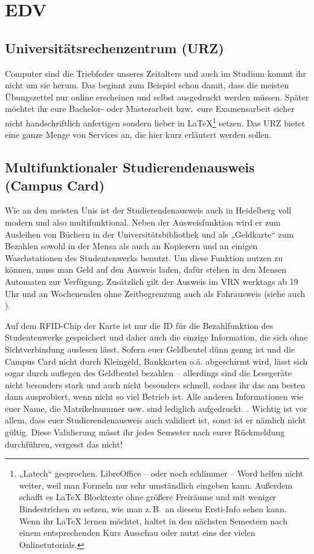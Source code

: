 \section{EDV}

\subsection{Universitätsrechenzentrum (URZ)}
\label{urz}
Computer sind die Triebfeder unseres Zeitalters und auch im Studium kommt ihr nicht um sie herum. Das beginnt zum Beispiel schon damit, dass die meisten Übungszettel nur online erscheinen und selbst ausgedruckt werden müssen. Später möchtet ihr eure Bachelor- oder Masterarbeit bzw.\ eure Examensarbeit sicher nicht handschriftlich anfertigen sondern lieber in \LaTeX \footnote{„Latech“ gesprochen. LibreOffice -- oder noch schlimmer -- Word helfen nicht weiter, weil man Formeln nur sehr umständlich eingeben kann. Außerdem schafft es \LaTeX{} Blocktexte ohne größere Freiräume und mit weniger Bindestrichen zu setzen, wie man z.\,B.\ an diesem Ersti-Info sehen kann. Wenn ihr \LaTeX{} lernen möchtet, haltet in den nächsten Semestern nach einem entsprechenden Kurs Ausschau oder nutzt eins der vielen Onlinetutorials.} setzen. Das  \gls{URZ} bietet eine ganze Menge von Services an, die hier kurz erläutert werden sollen.

\subsection*{Multifunktionaler Studierendenausweis (Campus Card)}
\label{campuscard}
Wie an den meisten Unis ist der Studierendenausweis auch in Heidelberg voll modern und also multifunktional.
Neben der Ausweisfunktion wird er zum Ausleihen von Büchern in der Universitätsbibliothek und als „Geldkarte“ zum Bezahlen sowohl in der Mensa als auch an Kopierern und an einigen Waschstationen des Studentenwerks benutzt. Um diese Funktion nutzen zu können, muss man Geld auf den Ausweis laden, dafür stehen in den Mensen Automaten zur Verfügung.
Zusätzlich gilt der Ausweis im \gls{VRN} werktags ab 19 Uhr und an Wochenenden ohne Zeitbegrenzung auch als Fahrausweis (siehe auch ).

Auf dem RFID-Chip der Karte ist nur die ID für die Bezahlfunktion des Studentenwerks gespeichert und daher auch die einzige Information, die sich ohne Sichtverbindung auslesen lässt. Sofern euer Geldbeutel dünn genug ist und die Campus Card nicht durch Kleingeld, Bankkarten o.ä. abgeschirmt wird, lässt sich sogar durch auflegen des Geldbeutel bezahlen -- allerdings sind die Lesegeräte nicht besonders stark und auch nicht besonders schnell, sodass ihr das am besten dann ausprobiert, wenn nicht so viel Betrieb ist. Alle anderen Informationen wie euer Name, die Matrikelnummer usw. sind lediglich aufgedruckt.
.
Wichtig ist vor allem, dass euer Studierendenausweis auch validiert ist, sonst ist er nämlich nicht gültig. Diese Validierung müsst ihr jedes Semester nach eurer Rückmeldung durchführen, vergesst das nicht!

